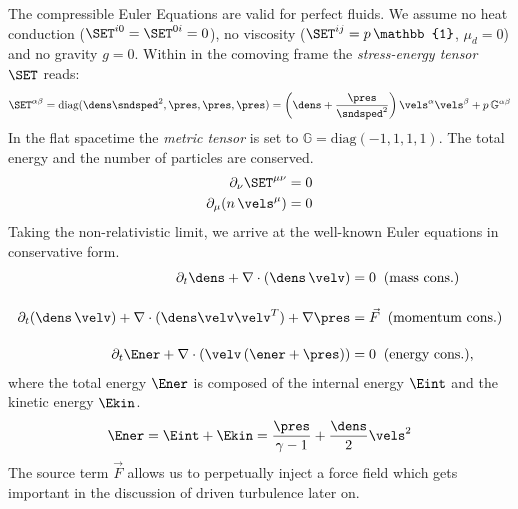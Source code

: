 

The compressible Euler Equations are valid for perfect fluids.  We assume no
heat conduction ($\SET^{i0} = \SET^{0i} = 0$), no viscosity ($\SET^{ij} =
p\,\mathbb{1}$, $\mu_d = 0$) and no gravity $g = 0$. Within in the comoving frame the
\emph{stress-energy tensor} $\SET$ reads:
\begin{equation}
\SET^{\alpha\beta} = \text{diag}(\dens\sndsped^2,\pres,\pres,\pres) = \left(\dens + \frac{\pres}{\sndsped^2}\right) \vels^\alpha\vels^\beta + p\,\mathbb{G}^{\alpha\beta}
\end{equation}
In the flat spacetime the \emph{metric tensor} is set to $\mathbb{G} = \text{diag}(-1,1,1,1)$. The total energy
and the number of particles are conserved.
\begin{align}
\partial_\nu \SET^{\mu\nu}  &= 0\\
\partial_\mu (n\,\vels^\mu) &= 0
\end{align}
Taking the non-relativistic limit, we arrive at the well-known Euler equations in conservative
form.
\begin{align}
\label{eq:comp-euler}
\partial_t\dens + \nabla \cdot (\dens\,\velv)   &=  0 \;\;\text{(mass cons.)}\\[0.4cm]
\partial_t(\dens\,\velv) + \nabla\cdot(\dens\velv\velv^T) + \nabla \pres &= \vec{F}  \;\;\text{(momentum cons.)}\\[0.4cm]
\partial_t \Ener + \nabla \cdot (\velv\,(\ener + \pres)) &=  0\;\;\text{(energy cons.)},
\end{align}
where the total energy $\Ener$ is composed of the internal energy $\Eint$ and
the kinetic energy $\Ekin$.
\begin{equation}
\Ener = \Eint + \Ekin = \frac{\pres}{\gamma -1} + \frac{\dens}{2}\vels^2
\end{equation}
The source term $\vec{F}$ allows us to perpetually inject a force field which gets important in the
discussion of driven turbulence later on.

